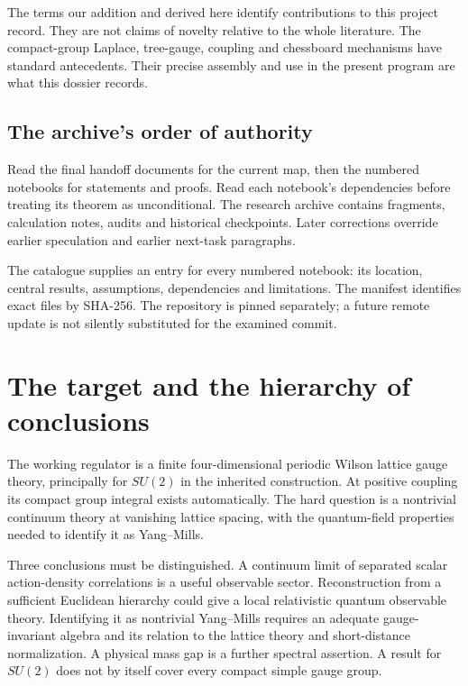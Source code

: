 The terms our addition and derived here identify contributions
to this project record. They are not claims of novelty relative
to the whole literature. The compact-group Laplace, tree-gauge,
coupling and chessboard mechanisms have standard antecedents.
Their precise assembly and use in the present program are what
this dossier records.

\subsection{The archive's order of authority}

Read the final handoff documents for the current map, then the
numbered notebooks for statements and proofs. Read each
notebook's dependencies before treating its theorem as
unconditional. The research archive contains fragments,
calculation notes, audits and historical checkpoints. Later
corrections override earlier speculation and earlier next-task
paragraphs.

The catalogue supplies an entry for every numbered notebook:
its location, central results, assumptions, dependencies and
limitations. The manifest identifies exact files by SHA-256.
The repository is pinned separately; a future remote update
is not silently substituted for the examined commit.

\section{The target and the hierarchy of conclusions}
\label{hdc-target}

The working regulator is a finite four-dimensional periodic
Wilson lattice gauge theory, principally for \(SU(2)\) in the
inherited construction. At positive coupling its compact group
integral exists automatically. The hard question is a nontrivial
continuum theory at vanishing lattice spacing, with the
quantum-field properties needed to identify it as Yang--Mills.

Three conclusions must be distinguished. A continuum limit of
separated scalar action-density correlations is a useful
observable sector. Reconstruction from a sufficient Euclidean
hierarchy could give a local relativistic quantum observable
theory. Identifying it as nontrivial Yang--Mills requires an
adequate gauge-invariant algebra and its relation to the lattice
theory and short-distance normalization. A physical mass gap is
a further spectral assertion. A result for \(SU(2)\) does not
by itself cover every compact simple gauge group.


